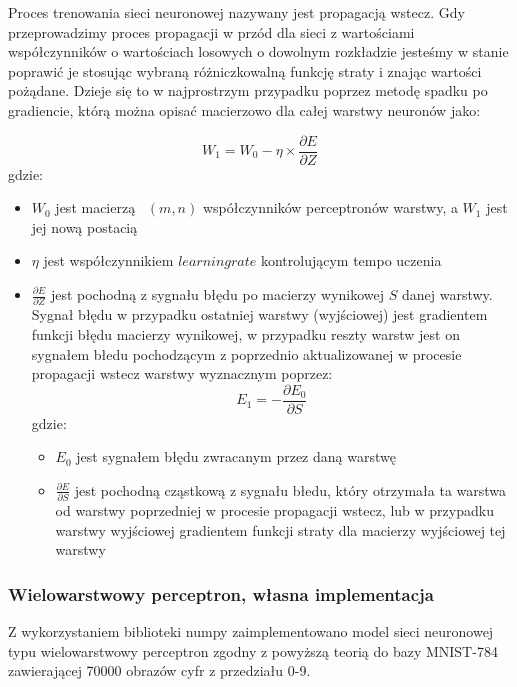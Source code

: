 \documentclass{article}
\begin{document}
Proces trenowania sieci neuronowej nazywany jest propagacją wstecz. Gdy 
przeprowadzimy proces propagacji w przód dla sieci z wartościami współczynników
o wartościach losowych o dowolnym rozkładzie jesteśmy w stanie poprawić 
je stosując wybraną różniczkowalną funkcję straty i znając wartości pożądane. Dzieje się to 
w najprostrzym przypadku poprzez metodę spadku po gradiencie, którą można 
opisać macierzowo dla całej warstwy neuronów jako:

\begin{equation}
    W_1 = W_0 - \eta \times \frac{\partial E}{\partial Z}
\end{equation}
gdzie:
\begin{itemize}
    \item $W_0$ jest macierzą ~$(m, n)$ współczynników perceptronów warstwy, a $W_1$ jest jej nową postacią
    \item $\eta$ jest współczynnikiem $learning rate$ kontrolującym tempo uczenia
    \item $\frac{\partial E}{\partial Z}$ jest pochodną z sygnału błędu po 
    macierzy wynikowej $S$ danej warstwy. Sygnał błędu w przypadku ostatniej warstwy (wyjściowej) jest
    gradientem funkcji błędu macierzy wynikowej, w przypadku reszty warstw 
    jest on sygnałem błedu pochodzącym z poprzednio aktualizowanej w procesie propagacji wstecz warstwy
    wyznacznym poprzez:
    \begin{equation}
        E_1 = -\frac{\partial E_0}{\partial S}
    \end{equation}
    gdzie:
    \begin{itemize}
        \item $E_0$ jest sygnałem błędu zwracanym przez daną warstwę
        \item $\frac{\partial E}{\partial S}$ jest pochodną cząstkową z sygnału błedu, 
        który otrzymała ta warstwa od warstwy poprzedniej w procesie propagacji wstecz, lub w przypadku warstwy
        wyjściowej gradientem funkcji straty dla macierzy wyjściowej tej warstwy
    \end{itemize}
\end{itemize}


\subsubsection{Wielowarstwowy perceptron, własna implementacja}

Z wykorzystaniem biblioteki numpy zaimplementowano model sieci neuronowej 
typu wielowarstwowy perceptron zgodny z powyższą teorią do bazy MNIST-784 zawierającej 70000 obrazów cyfr z przedziału 0-9.
\end{document}
